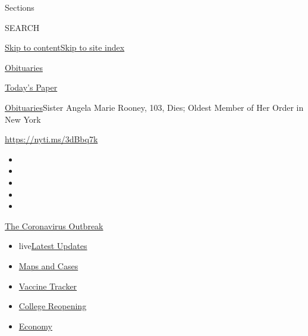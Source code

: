 Sections

SEARCH

\protect\hyperlink{site-content}{Skip to
content}\protect\hyperlink{site-index}{Skip to site index}

\href{https://www.nytimes3xbfgragh.onion/section/obituaries}{Obituaries}

\href{https://myaccount.nytimes3xbfgragh.onion/auth/login?response_type=cookie\&client_id=vi}{}

\href{https://www.nytimes3xbfgragh.onion/section/todayspaper}{Today's
Paper}

\href{/section/obituaries}{Obituaries}\textbar{}Sister Angela Marie
Rooney, 103, Dies; Oldest Member of Her Order in New York

\url{https://nyti.ms/3dBbq7k}

\begin{itemize}
\item
\item
\item
\item
\item
\end{itemize}

\href{https://www.nytimes3xbfgragh.onion/news-event/coronavirus?action=click\&pgtype=Article\&state=default\&region=TOP_BANNER\&context=storylines_menu}{The
Coronavirus Outbreak}

\begin{itemize}
\tightlist
\item
  live\href{https://www.nytimes3xbfgragh.onion/2020/08/04/world/coronavirus-covid-19.html?action=click\&pgtype=Article\&state=default\&region=TOP_BANNER\&context=storylines_menu}{Latest
  Updates}
\item
  \href{https://www.nytimes3xbfgragh.onion/interactive/2020/us/coronavirus-us-cases.html?action=click\&pgtype=Article\&state=default\&region=TOP_BANNER\&context=storylines_menu}{Maps
  and Cases}
\item
  \href{https://www.nytimes3xbfgragh.onion/interactive/2020/science/coronavirus-vaccine-tracker.html?action=click\&pgtype=Article\&state=default\&region=TOP_BANNER\&context=storylines_menu}{Vaccine
  Tracker}
\item
  \href{https://www.nytimes3xbfgragh.onion/2020/08/02/us/covid-college-reopening.html?action=click\&pgtype=Article\&state=default\&region=TOP_BANNER\&context=storylines_menu}{College
  Reopening}
\item
  \href{https://www.nytimes3xbfgragh.onion/live/2020/08/03/business/stock-market-today-coronavirus?action=click\&pgtype=Article\&state=default\&region=TOP_BANNER\&context=storylines_menu}{Economy}
\end{itemize}

